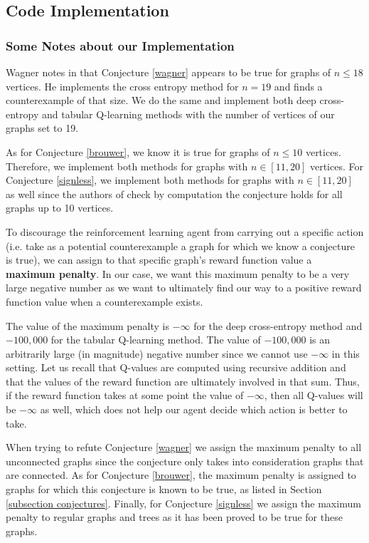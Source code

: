 \documentclass[11pt]{article}
\theoremstyle{definition}
\begin{document}
\subsection{Code Implementation}

\subsubsection{Some Notes about our Implementation}

Wagner notes in \cite{Wagner:2021} that Conjecture \ref{wagner} appears to be true for graphs of $n \leq 18$ vertices. He implements the cross entropy method for $n=19$ and finds a counterexample of that size. We do the same and implement both deep cross-entropy and tabular Q-learning methods with the number of vertices of our graphs set to 19. 

As for Conjecture \ref{brouwer}, we know it is true for graphs of $n \leq 10$ vertices. Therefore, we implement both methods for graphs with $n\in [11, 20]$ vertices. For Conjecture \ref{signless}, we implement both methods for graphs with $n \in [11, 20]$ as well since the authors of \cite{Ashraf:Omidi:Tayfeh-Rezaie} check by computation the conjecture holds for all graphs up to 10 vertices.  

To discourage the reinforcement learning agent from carrying out a specific action (i.e. take as a potential counterexample a graph for which we know a conjecture is true), we can assign to that specific graph's reward function value a \textbf{maximum penalty}. In our case, we want this maximum penalty to be a very large negative number as we want to ultimately find our way to a positive reward function value when a counterexample exists. 

The value of the maximum penalty is $- \infty$ for the deep cross-entropy method and $- 100,000$ for the tabular Q-learning method. The value of $- 100,000$ is an arbitrarily large (in magnitude) negative number since we cannot use $- \infty$ in this setting. Let us recall that Q-values are computed using recursive addition and that the values of the reward function are ultimately involved in that sum. Thus, if the reward function takes at some point the value of $- \infty$, then all Q-values will be $- \infty$ as well, which does not help our agent decide which action is better to take.

When trying to refute Conjecture \ref{wagner} we assign the maximum penalty to all unconnected graphs since the conjecture only takes into consideration graphs that are connected. As for Conjecture \ref{brouwer}, the maximum penalty is assigned to graphs for which this conjecture is known to be true, as listed in Section \ref{subsection conjectures}. Finally, for Conjecture \ref{signless} we assign the maximum penalty to regular graphs and trees as it has been proved to be true for these graphs.
\end{document}
